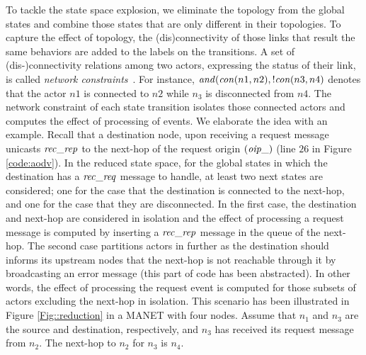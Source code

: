 To tackle the state space explosion, we eliminate the topology from the global states and combine those states that are only different in their topologies. To capture the effect of topology, the (dis)connectivity of those links that result the same behaviors are added to the labels on the transitions. A set of (dis-)connectivity relations among two actors, expressing the status of their link, is called \emph{network constraints}~\cite{FatemehFI10,FatemehFI19}. For instance, ${\it and}({\it con}(n1,n2),!{\it con}(n3,n4)$ denotes that the actor  $n1$ is connected to $n2$ while $n_3$ is disconnected from $n4$. The network constraint of each state transition isolates those connected actors and computes the effect of processing of events. %
We elaborate the idea with an example. Recall that a destination node, upon receiving a request message unicasts ${\it rec\_rep}$ to the next-hop of the request origin $({\it oip\_})$ (line $26$ in Figure \ref{code:aodv}). In the reduced state space,  for the global states in which the destination has a ${\it rec\_req}$ message to handle, at least two next states are considered; one for the case that the destination is connected to the next-hop, and one for the case that they are disconnected. In the first case, the destination and next-hop are considered in isolation and the effect of processing a request message is computed by inserting a ${\it rec\_rep}$ message in the queue of the next-hop. The second case partitions actors in further as the destination should informs its upstream nodes that the next-hop is not reachable through it by broadcasting an error message (this part of code has been abstracted). In other words, the effect of processing the request event is computed for those subsets of actors excluding the next-hop in isolation. This scenario has been illustrated in Figure \ref{Fig::reduction} in a MANET with four nodes. Assume that $n_1$ and $n_3$ are the source and destination, respectively, and $n_3$ has received its request message from $n_2$. The next-hop to $n_2$ for $n_3$ is $n_4$.  


